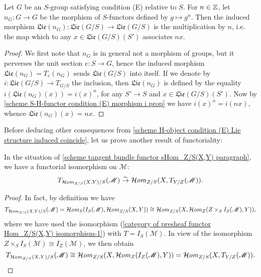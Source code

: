 \begin{corollary}\label{scheme S-group condition (E) power by n}
Let $G$ be an $S$-group satisfying condition (E) relative to $S$. For $n\in\mathbb{Z}$, let $n_G:G\to G$ be the morphism of $S$-functors defined by $g\mapsto g^n$. Then the induced morphism $\mathfrak{Lie}(n_G):\mathfrak{Lie}(G/S)\to\mathfrak{Lie}(G/S)$ is the multiplication by $n$, i.e. the map which to any $x\in\mathfrak{Lie}(G/S)(S')$ associates $nx$.
\end{corollary}
\begin{proof}
We first note that $n_G$ is in general not a morphism of groups, but it perverses the unit section $e:S\to G$, hence the induced morphism $\mathfrak{Lie}(n_G)=T_e(n_G)$ sends $\mathfrak{Lie}(G/S)$ into itself. If we denote by $i:\mathfrak{Lie}(G/S)\to T_{G/S}$ the inclusion, then $\mathfrak{Lie}(n_G)$ is defined by the equality $i(\mathfrak{Lie}(n_G)(x))=i(x)^n$, for any $S'\to S$ and $x\in\mathfrak{Lie}(G/S)(S')$. Now by \cref{scheme S-H-functor condition (E) morphism i prop} we have $i(x)^n=i(nx)$, whence $\mathfrak{Lie}(n_G)(x)=nx$.
\end{proof}

Before deducing other consequences from \cref{scheme H-object condition (E) Lie structure induced coincide}, let us prove another result of functoriality:

\begin{proposition}\label{scheme tangent bundle functor and sHom commutes}
In the situation of \ref{scheme tangent bundle functor sHom_Z/S(X,Y) paragraph}, we have a functorial isomorphism on $\mathscr{M}$:
\[T_{\operatorname{\mathcal{H}\hspace*{-0.4pt}\textit{om}\hspace{0.5pt}}_{Z/S}(X,Y)/S}(\mathscr{M})\stackrel{\sim}{\to} \operatorname{\mathcal{H}\hspace*{-0.4pt}\textit{om}\hspace{0.5pt}}_{Z/S}(X,T_{Y/Z}(\mathscr{M})).\]
\end{proposition}
\begin{proof}
In fact, by definition we have
\[T_{\operatorname{\mathcal{H}\hspace*{-0.4pt}\textit{om}\hspace{0.5pt}}_{Z/S}(X,Y)/S}(\mathscr{M})=\operatorname{\mathcal{H}\hspace*{-0.4pt}\textit{om}\hspace{0.5pt}}_S(I_S(\mathscr{M}),\operatorname{\mathcal{H}\hspace*{-0.4pt}\textit{om}\hspace{0.5pt}}_{Z/S}(X,Y))\cong\operatorname{\mathcal{H}\hspace*{-0.4pt}\textit{om}\hspace{0.5pt}}_{Z/S}(X,\operatorname{\mathcal{H}\hspace*{-0.4pt}\textit{om}\hspace{0.5pt}}_Z(Z\times_SI_S(\mathscr{M}),Y)),\]
where we have used the isomorphism (\ref{category of presheaf functor Hom_Z/S(X,Y) isomorphism-1}) with $T=I_S(\mathscr{M})$. In view of the isomorphism $Z\times_SI_S(\mathscr{M})\cong I_Z(\mathscr{M})$, we then obtain
\begin{equation*}
T_{\operatorname{\mathcal{H}\hspace*{-0.4pt}\textit{om}\hspace{0.5pt}}_{Z/S}(X,Y)/S}(\mathscr{M})\cong\operatorname{\mathcal{H}\hspace*{-0.4pt}\textit{om}\hspace{0.5pt}}_{Z/S}(X,\operatorname{\mathcal{H}\hspace*{-0.4pt}\textit{om}\hspace{0.5pt}}_Z(I_Z(\mathscr{M}),Y))=\operatorname{\mathcal{H}\hspace*{-0.4pt}\textit{om}\hspace{0.5pt}}_{Z/S}(X,T_{Y/Z}(\mathscr{M})).\qedhere
\end{equation*}
\end{proof}

